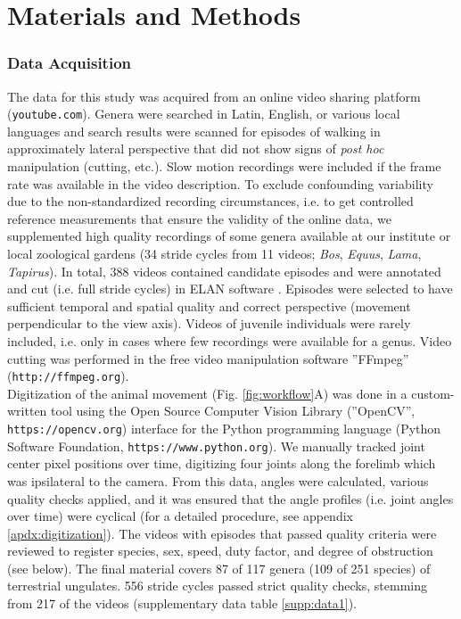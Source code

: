 \FloatBarrier\pagebreak
\section{Materials and Methods}
\subsubsection{Data Acquisition}
The data for this study was acquired from an online video sharing platform (\nolinkurl{youtube.com}).
Genera were searched in Latin, English, or various local languages and search results were scanned for episodes of walking in approximately lateral perspective that did not show signs of \textit{post hoc} manipulation (cutting, etc.).
Slow motion recordings were included if the frame rate was available in the video description.
To exclude confounding variability due to the non-standardized recording circumstances, i.e. to get controlled reference measurements that ensure the validity of the online data, we supplemented high quality recordings of some genera available at our institute or local zoological gardens (34 stride cycles from 11 videos; \textit{Bos}, \textit{Equus}, \textit{Lama}, \textit{Tapirus}).
In total, 388 videos contained candidate episodes and were annotated and cut (i.e. full stride cycles) in ELAN software \cite[Max Planck Institute for Psycholinguistics, Nijmegen;][]{Brugman2004}.
Episodes were selected to have sufficient temporal and spatial quality and correct perspective (movement perpendicular to the view axis).
Videos of juvenile individuals were rarely included, i.e. only in cases where few recordings were available for a genus.
Video cutting was performed in the free video manipulation software ''FFmpeg'' (\nolinkurl{http://ffmpeg.org}).
\\Digitization of the animal movement (Fig. \ref{fig:workflow}A) was done in a custom-written tool using the Open Source Computer Vision Library (''OpenCV'', \nolinkurl{https://opencv.org}) interface for the Python programming language (Python Software Foundation, \nolinkurl{https://www.python.org}).
We manually tracked joint center pixel positions over time, digitizing four joints along the forelimb which was ipsilateral to the camera.
From this data, angles were calculated, various quality checks applied, and it was ensured that the angle profiles (i.e. joint angles over time) were cyclical (for a detailed procedure, see appendix \ref*{apdx:digitization}).
The videos with episodes that passed quality criteria were reviewed to register species, sex, speed, duty factor, and degree of obstruction (see below).
The final material covers 87 of 117 genera (109 of 251 species) of terrestrial ungulates.
556 stride cycles passed strict quality checks, stemming from 217 of the videos (supplementary data table \ref*{supp:data1}).


